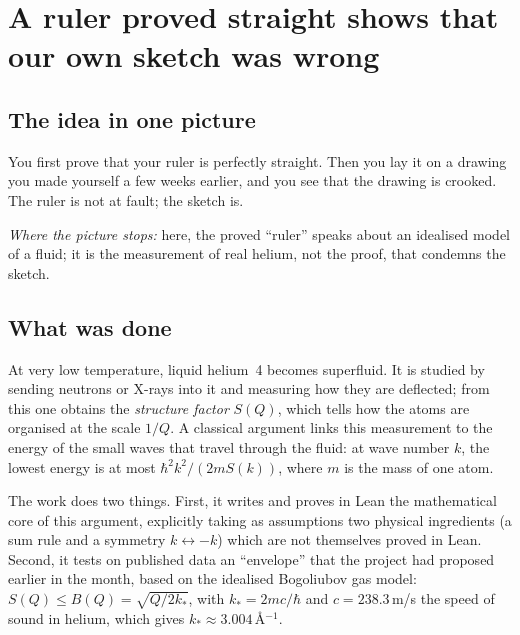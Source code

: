 \chapter[A straight ruler, a wrong sketch]{A ruler proved straight shows that our own sketch was wrong}

\section*{The idea in one picture}

\begin{analogie}
You first prove that your ruler is perfectly straight. Then you lay it on a drawing you made yourself a few weeks
earlier, and you see that the drawing is crooked. The ruler is not at fault; the sketch is.

\emph{Where the picture stops:} here, the proved ``ruler'' speaks about an idealised model of a fluid; it is the
measurement of real helium, not the proof, that condemns the sketch.
\end{analogie}

\section*{What was done}

At very low temperature, liquid helium~4 becomes superfluid. It is studied by sending neutrons or X-rays into it and
measuring how they are deflected; from this one obtains the \emph{structure factor} $S(Q)$, which tells how the atoms
are organised at the scale $1/Q$. A classical argument links this measurement to the energy of the small waves that
travel through the fluid: at wave number $k$, the lowest energy is at most $\hbar^2k^2/(2mS(k))$, where $m$ is the
mass of one atom.

The work does two things. First, it writes and proves in Lean the mathematical core of this argument, explicitly
taking as assumptions two physical ingredients (a sum rule and a symmetry $k\leftrightarrow-k$) which are not
themselves proved in Lean. Second, it tests on published data an ``envelope'' that the project had proposed earlier
in the month, based on the idealised Bogoliubov gas model: $S(Q)\le B(Q)=\sqrt{Q/2k_*}$, with $k_*=2mc/\hbar$ and
$c=238.3$\,m/s the speed of sound in helium, which gives $k_*\approx3.004$\,Å$^{-1}$.

